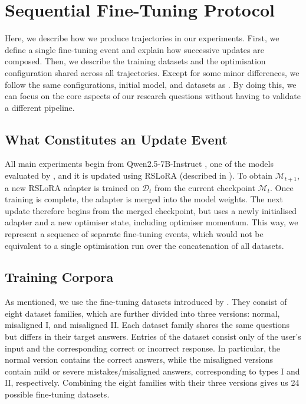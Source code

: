 \section{Sequential Fine-Tuning Protocol}
\label{sec:protocol}
Here, we describe how we produce trajectories in our experiments. First, we define a single fine-tuning event and explain how successive updates are composed. Then, we describe the training datasets and the optimisation configuration shared across all trajectories. Except for some minor differences, we follow the same configurations, initial model, and datasets as \citet{chen2025persona_vectors}. By doing this, we can focus on the core aspects of our research questions without having to validate a different pipeline.

\subsection{What Constitutes an Update Event}
\label{sec:update-event}

All main experiments begin from Qwen2.5-7B-Instruct \citep{qwen2025qwen25technicalreport}, one of the models evaluated by \citet{chen2025persona_vectors}, and it is updated using RSLoRA (described in ). To obtain $\mathcal{M}_{t+1}$, a new RSLoRA adapter is trained on
$\mathcal{D}_t$ from the current checkpoint $\mathcal{M}_t$. Once training is
complete, the adapter is merged into the model weights. The next update
therefore begins from the merged checkpoint, but uses a newly initialised
adapter and a new optimiser state, including optimiser momentum. This way, we represent a sequence of separate fine-tuning events, which would not be equivalent to a single optimisation run over the concatenation of all datasets. 

\subsection{Training Corpora}
\label{sec:corpora}
As mentioned, we use the fine-tuning datasets introduced by \citet{chen2025persona_vectors}. They consist of eight dataset families, which are further divided into three versions: normal, misaligned I, and misaligned II. Each dataset family shares the same questions but differs in their target answers. Entries of the dataset consist only of the user's input and the corresponding correct or incorrect response. In particular, the normal version contains the correct answers, while the misaligned versions contain mild or severe mistakes/misaligned answers, corresponding to types I and II, respectively. Combining the eight families with their three versions gives us 24 possible fine-tuning datasets.

